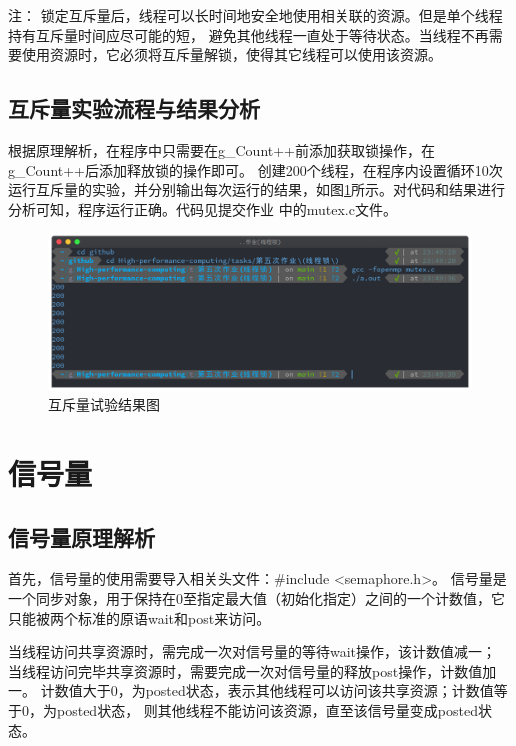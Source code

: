 \documentclass[11pt]{ctexart}
\newenvironment{note}{\kaishu 注：}{}
\begin{document}
\begin{note}
    锁定互斥量后，线程可以长时间地安全地使用相关联的资源。但是单个线程持有互斥量时间应尽可能的短，
    避免其他线程一直处于等待状态。当线程不再需要使用资源时，它必须将互斥量解锁，使得其它线程可以使用该资源。
\end{note}

\subsection{互斥量实验流程与结果分析}

根据原理解析，在程序中只需要在{\ttfamily g\_Count++}前添加获取锁操作，在{\ttfamily g\_Count++}后添加释放锁的操作即可。
创建200个线程，在程序内设置循环10次运行互斥量的实验，并分别输出每次运行的结果，如图\ref{mutex}所示。对代码和结果进行分析可知，程序运行正确。代码见提交作业
中的{\ttfamily mutex.c}文件。
 
\begin{figure}[ht]
    \centering
    \includegraphics[scale=0.4]{../mutex.png}
    \caption{互斥量试验结果图}
    \label{mutex}
\end{figure}

\section{信号量}

\subsection{信号量原理解析}

首先，信号量的使用需要导入相关头文件：{\ttfamily \#include <semaphore.h>}。
信号量是一个同步对象，用于保持在0至指定最大值（初始化指定）之间的一个计数值，它只能被两个标准的原语{\ttfamily wait}和{\ttfamily post}来访问。

当线程访问共享资源时，需完成一次对信号量的等待{\ttfamily wait}操作，该计数值减一；
当线程访问完毕共享资源时，需要完成一次对信号量的释放{\ttfamily post}操作，计数值加一。
计数值大于0，为{\ttfamily posted}状态，表示其他线程可以访问该共享资源；计数值等于0，为{\ttfamily posted}状态，
则其他线程不能访问该资源，直至该信号量变成{\ttfamily posted}状态。
\end{document}
